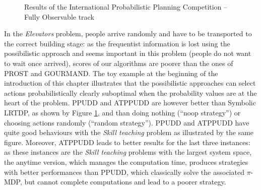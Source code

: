 \begin{figure}
\caption[Results of IPPC 2014: \textit{Elevators} and \textit{Skill teaching problems}]{
Results of the International Probabilistic Planning Competition -- Fully Observable track}
\label{figure_IPPC_ELE_SKI}
\end{figure}

In the \textit{Elevators} problem, people arrive randomly and have to be transported 
to the correct building stage: 
as the frequentist information is lost using the possibilistic approach
and seems important in this problem (people do not want to wait once arrived), 
scores of our algorithms are poorer than the ones of PROST and GOURMAND.
The toy example at the beginning of the introduction of this chapter
illustrates that the possibilistic approaches can select actions probabilistically clearly suboptimal
when the probability values are at the heart of the problem.
PPUDD and ATPPUDD are however better than Symbolic LRTDP, as shown by Figure \ref{figure_IPPC_ELE_SKI},
and than doing nothing (``noop strategy'') or choosing actions randomly (``random strategy'').
PPUDD and ATPPUDD have quite good behaviours with the \textit{Skill teaching} problem 
as illustrated by the same figure. Moreover, ATPPUDD leads to better results
for the last three instances: as these instances are the \textit{Skill teaching} problems 
with the largest system space,  
the anytime version, which manages the computation time, 
produces strategies with better performances
than PPUDD, which classically solve the associated $\pi$-MDP, 
but cannot complete computations and lead to a poorer strategy.

